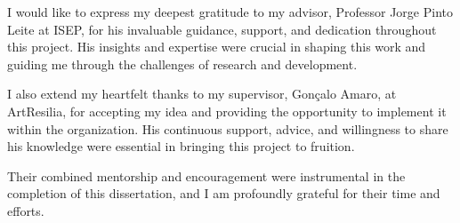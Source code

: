 
\begin{acknowledgements}

I would like to express my deepest gratitude to my advisor, Professor Jorge Pinto Leite at ISEP, for his invaluable guidance, support, and dedication throughout this project. 
His insights and expertise were crucial in shaping this work and guiding me through the challenges of research and development.

I also extend my heartfelt thanks to my supervisor, Gonçalo Amaro, at ArtResilia, for accepting my idea and providing the opportunity to implement it within the organization. 
His continuous support, advice, and willingness to share his knowledge were essential in bringing this project to fruition.

Their combined mentorship and encouragement were instrumental in the completion of this dissertation, and I am profoundly grateful for their time and efforts.

\end{acknowledgements}


\tableofcontents %

\listoffigures %

\listoftables %



\listoflistings %
\addchaptertocentry{\lstlistlistingname}



